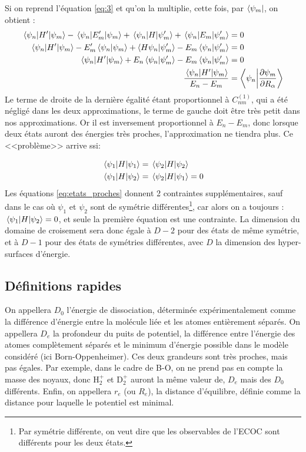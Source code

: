 Si on reprend l'équation \ref{eq:3} et qu'on la multiplie, cette fois, par $\bra{\psi_m}$, on obtient :
\begin{align*}
    \mel{\psi_n}{H'}{\psi_m} - \mel{\psi_n}{E_m'}{\psi_m} + \mel{\psi_n}{H}{\psi_m'} + \mel{\psi_n}{E_m}{\psi_m'} & = 0 \\
    \mel{\psi_n}{H'}{\psi_m} - E_m'\braket{\psi_n}{\psi_m} + \braket{H\psi_n}{\psi_m'} - E_m \braket{\psi_n}{\psi_m'} & = 0 \\
    \mel{\psi_n}{H'}{\psi_m} + E_n\braket{\psi_n}{\psi_m'} - E_m \braket{\psi_n}{\psi_m'} & = 0 \\
    \dfrac{\mel{\psi_n}{H'}{\psi_m}}{E_n-E_m} & = \braket{\psi_n}{\dfrac{\partial\psi_m}{\partial R_{\alpha}}}
\end{align*}
Le terme de droite de la dernière égalité étant proportionnel à $C_{nm}^{(1)}$, qui a été négligé dans les deux approximations, le terme de gauche doit être très petit dans nos approximations. Or il est inversement proportionnel à $E_n-E_m$, donc lorsque deux états auront des énergies très proches, l'approximation ne tiendra plus. Ce <<problème>> arrive ssi:


\begin{equation}\label{eq:etats_proches}
\begin{split}
    & \mel{\psi_1}{H}{\psi_1} = \mel{\psi_2}{H}{\psi_2} \\
    & \mel{\psi_1}{H}{\psi_2} = \mel{\psi_2}{H}{\psi_1} = 0\\
\end{split}
\end{equation}
Les équations \ref{eq:etats_proches} donnent 2 contraintes supplémentaires, sauf dans le cas où $\psi_1$ et $\psi_2$ sont de symétrie différentes\footnote{Par symétrie différente, on veut dire que les observables de l'ECOC sont différents pour les deux états.}, car alors on a toujours : $\mel{\psi_1}{H}{\psi_2} = 0$, et seule la première équation est une contrainte. La dimension du domaine de croisement sera donc égale à $D-2$ pour des états de même symétrie, et à $D-1$ pour des états de symétries différentes, avec $D$ la dimension des hyper-surfaces d'énergie.



\subsection{Définitions rapides}
On appellera $D_0$ l'énergie de dissociation, déterminée expérimentalement comme la différence d'énergie entre la molécule liée et les atomes entièrement séparés.
On appellera $D_e$ la profondeur du puits de potentiel, la différence entre l'énergie des atomes complètement séparés et le minimum d'énergie possible dans le modèle considéré (ici Born-Oppenheimer).
Ces deux grandeurs sont très proches, mais pas égales. Par exemple, dans le cadre de B-O, on ne prend pas en compte la masse des noyaux, donc H$^+_2$ et D$^+_2$ auront la même valeur de, $D_e$ mais des $D_0$ différents. Enfin, on appellera $r_e$ (ou $R_e$), la distance d'équilibre, définie comme la distance pour laquelle le potentiel est minimal.


